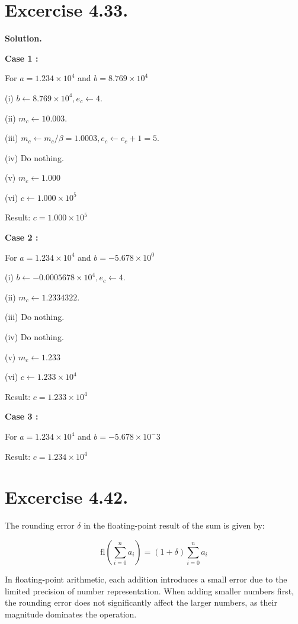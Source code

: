 \documentclass[a4paper]{article}
\begin{document}
\section*{Excercise 4.33.}

\textbf{Solution.}

\textbf{Case 1 :}

For $a = 1.234 \times 10^4$ and $b = 8.769 \times 10^4$

(i) $b \leftarrow 8.769 \times 10^4, e_c \leftarrow 4.$

(ii) $m_c \leftarrow 10.003.$

(iii) $m_c \leftarrow m_c / \beta = 1.0003, e_c \leftarrow e_c + 1 = 5$.

(iv) Do nothing.

(v) $m_c \leftarrow 1.000$

(vi) $c \leftarrow 1.000 \times 10^5$

Result: $c = 1.000 \times 10^5$

\textbf{Case 2 :}

For $a = 1.234 \times 10^4$ and $b = -5.678 \times 10^0$

(i) $b \leftarrow -0.0005678 \times 10^4, e_c \leftarrow 4.$

(ii) $m_c \leftarrow 1.2334322.$

(iii) Do nothing.

(iv) Do nothing.

(v) $m_c \leftarrow 1.233$

(vi) $c \leftarrow 1.233 \times 10^4$

Result: $c = 1.233 \times 10^4$

\textbf{Case 3 :}

For $a = 1.234 \times 10^4$ and $b = -5.678 \times 10^-3$

Result: $c = 1.234 \times 10^4$


\section*{Excercise 4.42.}

The rounding error \(\delta\) in the floating-point result of the sum is given by:

\[
\text{fl}\left( \sum_{i=0}^{n} a_i \right) = \left( 1 + \delta \right) \sum_{i=0}^{n} a_i
\]

In floating-point arithmetic, each addition introduces a small error due to the limited precision of number representation. When adding smaller numbers first, the rounding error does not significantly affect the larger numbers, as their magnitude dominates the operation. 
\end{document}
